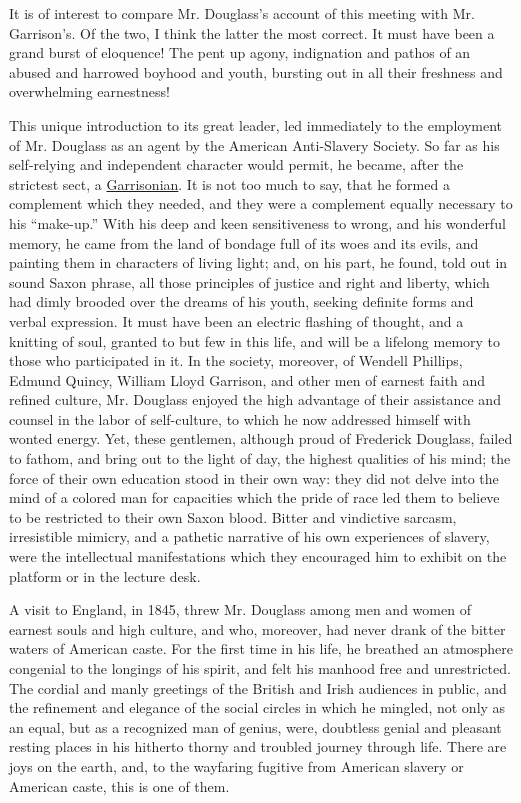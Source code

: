 It is of interest to compare Mr. Douglass's account of this meeting with
Mr. Garrison's. Of the two, I think the latter the most correct. It must
have been a grand burst of eloquence! The pent {}up agony, indignation
and pathos of an abused and harrowed boyhood and youth, bursting out in
all their freshness and overwhelming earnestness!

This unique introduction to its great leader, led immediately to the
employment of Mr. Douglass as an agent by the American Anti-Slavery
Society. So far as his self-relying and independent character would
permit, he became, after the strictest sect, a
\href{https://en.wikipedia.org/wiki/William_Lloyd_Garrison}{Garrisonian}.
It is not too much to say, that he formed a complement which they
needed, and they were a complement equally necessary to his ``make-up.''
With his deep and keen sensitiveness to wrong, and his wonderful memory,
he came from the land of bondage full of its woes and its evils, and
painting them in characters of living light; and, on his part, he found,
told out in sound Saxon phrase, all those principles of justice and
right and liberty, which had dimly brooded over the dreams of his youth,
seeking definite forms and verbal expression. It must have been an
electric flashing of thought, and a knitting of soul, granted to but few
in this life, and will be a lifelong memory to those who participated in
it. In the society, moreover, of Wendell Phillips, Edmund Quincy,
William Lloyd Garrison, and other men of earnest faith and refined
culture, Mr. Douglass enjoyed the high advantage of their assistance and
counsel in the labor of self-culture, to which he now addressed himself
with wonted energy. Yet, these gentlemen, although proud of Frederick
Douglass, failed to fathom, and bring out to the light of day, the
highest qualities of his mind; the force of their own education stood in
their own way: they did not delve into the mind of a colored man for
capacities which the pride of race led them to believe to be restricted
to their own Saxon blood. Bitter and vindictive sarcasm, irresistible
mimicry, and a pathetic narrative of his own experiences of slavery,
were the intellectual manifestations which they encouraged him to
exhibit on the platform or in the lecture desk.

A visit to England, in 1845, threw Mr. Douglass among men and women of
earnest souls and high culture, and who, moreover, had never drank of
the bitter waters of American caste. For the first time in his life, he
breathed an atmosphere congenial to the longings of his spirit, and felt
his manhood free and unrestricted. The cordial and manly greetings of
the British and Irish audiences in {}public, and the refinement and
elegance of the social circles in which he mingled, not only as an
equal, but as a recognized man of genius, were, doubtless genial and
pleasant resting places in his hitherto thorny and troubled journey
through life. There are joys on the earth, and, to the wayfaring
fugitive from American slavery or American caste, this is one of them.

